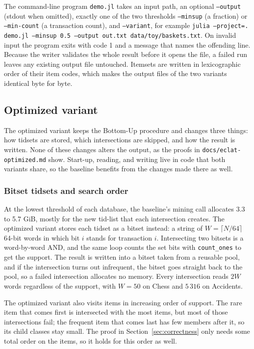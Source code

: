 The command-line program \texttt{demo.jl} takes an input path, an optional
\texttt{--output} (stdout when omitted), exactly one of the two thresholds \texttt{--minsup} (a fraction) or
\texttt{--min-count} (a transaction count), and \texttt{--variant}, for example
\texttt{julia --project=. demo.jl --minsup 0.5 --output out.txt data/toy/baskets.txt}.
On invalid input the program exits with code 1 and a message that names the offending
line. Because the writer validates the whole result before it opens the file, a failed
run leaves any existing output file untouched. Itemsets are written in lexicographic order
of their item codes, which makes the output files of the two variants identical byte for
byte.

\subsection{Optimized variant}
\label{sec:optimized}
The optimized variant keeps the Bottom-Up procedure and changes three things: how
tidsets are stored, which intersections are skipped, and how the result is written. None
of these changes alters the output, as the proofs in \texttt{docs/eclat-optimized.md}
show. Start-up, reading, and writing live in code that both variants share, so the
baseline benefits from the changes made there as well.

\subsubsection{Bitset tidsets and search order}
At the lowest threshold of each database, the baseline's mining call allocates 3.3 to
5.7 GiB, mostly for the new tid-list that each intersection creates. The optimized variant
stores each tidset as a bitset instead: a string of $W = \lceil N/64 \rceil$ 64-bit words
in which bit $i$ stands for transaction $i$. Intersecting two bitsets is a word-by-word
AND, and the same loop counts the set bits with \texttt{count\_ones} to get the support.
The result is written into a bitset taken from a reusable pool, and if the intersection
turns out infrequent, the bitset goes straight back to the pool, so a failed intersection
allocates no memory. Every intersection reads $2W$ words regardless of the support, with
$W = 50$ on Chess and $5\,316$ on Accidents.

The optimized variant also visits items in increasing order of support. The rare item
that comes first is intersected with the most items, but most of those intersections
fail; the frequent item that comes last has few members after it, so its child classes
stay small. The proof in Section~\ref{sec:correctness} only needs some total order on the
items, so it holds for this order as well.

